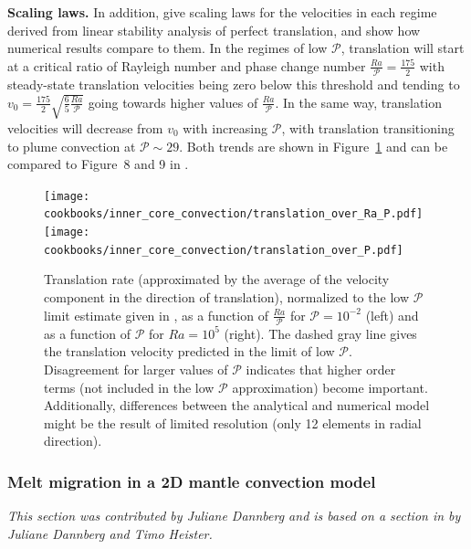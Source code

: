 \documentclass{article}
\begin{document}
\vspace{0.3cm}
\textbf{Scaling laws.} 
In addition, \cite{Deguen2013} give scaling laws for the velocities in each regime derived from linear stability 
analysis of perfect translation, and show how numerical results compare to them. In the regimes of low $\mathcal{P}$, translation will start 
at a critical ratio of Rayleigh number and phase change number $\frac{Ra}{\mathcal{P}}=\frac{175}{2}$ with steady-state 
translation velocities being zero below this threshold and tending to $v_0=\frac{175}{2}\sqrt{\frac{6}{5}\frac{Ra}{\mathcal{P}}}$ 
going towards higher values of $\frac{Ra}{\mathcal{P}}$.
In the same way, translation velocities will decrease from $v_0$ with increasing $\mathcal{P}$, with translation transitioning
to plume convection at $\mathcal{P}\sim29$. 
Both trends are shown in Figure~\ref{fig:inner-core-trends} and can be compared to Figure~8 and 9 in \cite{Deguen2013}.
 
\begin{figure}
    \centering
    \texttt{[image: cookbooks/inner\_core\_convection/translation\_over\_Ra\_P.pdf]}
    \hfill
    \texttt{[image: cookbooks/inner\_core\_convection/translation\_over\_P.pdf]}
    \caption{Translation rate (approximated by the average of the velocity component in the direction of translation), 
    normalized to the low $\mathcal{P}$ 
    limit estimate given in \cite{Deguen2013}, as a function of $\frac{Ra}{\mathcal{P}}$ for $\mathcal{P}=10^{-2}$ 
    (left) and as a function of $\mathcal{P}$ for $Ra=10^5$ (right).
    The dashed gray line gives the translation velocity predicted in the limit of low $\mathcal{P}$. Disagreement 
    for larger values of $\mathcal{P}$ indicates that higher order terms (not included in the low $\mathcal{P}$
    approximation) become important. Additionally, differences between the analytical and numerical model might 
    be the result of limited resolution (only 12 elements in radial direction).}
    \label{fig:inner-core-trends}
\end{figure}

\subsubsection{Melt migration in a 2D mantle convection model}
\label{sec:cookbooks-melt-global}

\textit{This section was contributed by Juliane Dannberg and is based on a section in \cite{dannberg_melt} by Juliane Dannberg and Timo Heister.}
\end{document}
